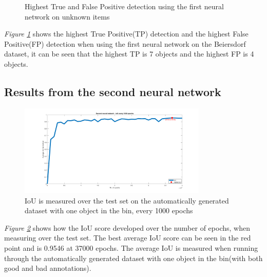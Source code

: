 \begin{figure}[h]
 \centering
 \hfill
 
 \caption{Highest True and False Positive detection using the first neural network on unknown items}
 \label{fig:v1max}
\end{figure}
\textit{Figure \ref{fig:v1max}} shows the highest True Positive(TP) detection and the highest False Positive(FP) detection when using the first neural network on the Beiersdorf dataset, it can be seen that the highest TP is 7 objects and the highest FP is 4 objects.
\clearpage

\subsection{Results from the second neural network}\label{sec:secondneural}

\begin{figure}[h]
 \centering
 \includegraphics[width=0.8\textwidth, trim={5cm 0 4cm 0},clip]{graphics/results/secondneuralnetworkauto.png}
 \caption{IoU is measured over the test set on the automatically generated dataset with one object in the bin, every 1000 epochs}
 \label{fig:v2neuralnetwork}
\end{figure}
\textit{Figure \ref{fig:v2neuralnetwork}} shows how the IoU score developed over the number of epochs, when measuring over the test set. The best average IoU score can be seen in the red point and is 0.9546 at 37000 epochs. The average IoU is measured when running through the automatically generated dataset with one object in the bin(with both good and bad annotations).


